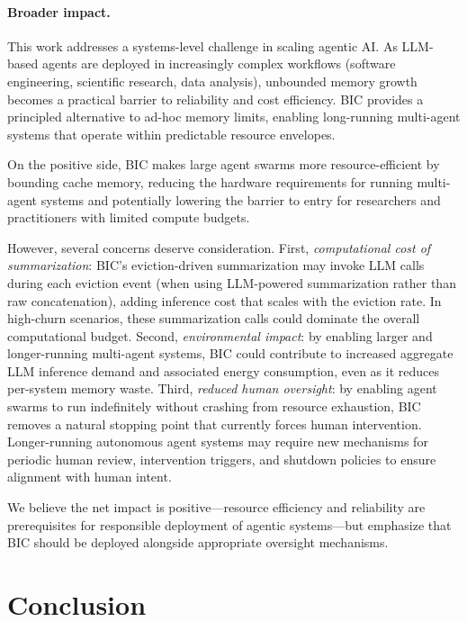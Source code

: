 \paragraph{Broader impact.}
This work addresses a systems-level challenge in scaling agentic AI.
As LLM-based agents are deployed in increasingly complex workflows
(software engineering, scientific research, data analysis), unbounded
memory growth becomes a practical barrier to reliability and cost
efficiency.  BIC provides a principled alternative to ad-hoc memory
limits, enabling long-running multi-agent systems that operate within
predictable resource envelopes.

On the positive side, BIC makes large agent swarms more
resource-efficient by bounding cache memory, reducing the hardware
requirements for running multi-agent systems and potentially lowering
the barrier to entry for researchers and practitioners with limited
compute budgets.

However, several concerns deserve consideration.  First,
\emph{computational cost of summarization}: BIC's eviction-driven
summarization may invoke LLM calls during each eviction event (when
using LLM-powered summarization rather than raw concatenation),
adding inference cost that scales with the eviction rate.  In
high-churn scenarios, these summarization calls could dominate the
overall computational budget.  Second, \emph{environmental impact}:
by enabling larger and longer-running multi-agent systems, BIC could
contribute to increased aggregate LLM inference demand and associated
energy consumption, even as it reduces per-system memory waste.
Third, \emph{reduced human oversight}: by enabling agent swarms to
run indefinitely without crashing from resource exhaustion, BIC
removes a natural stopping point that currently forces human
intervention.  Longer-running autonomous agent systems may require
new mechanisms for periodic human review, intervention triggers, and
shutdown policies to ensure alignment with human intent.

We believe the net impact is positive---resource efficiency and
reliability are prerequisites for responsible deployment of agentic
systems---but emphasize that BIC should be deployed alongside
appropriate oversight mechanisms.


\section{Conclusion}
\label{sec:conclusion}

